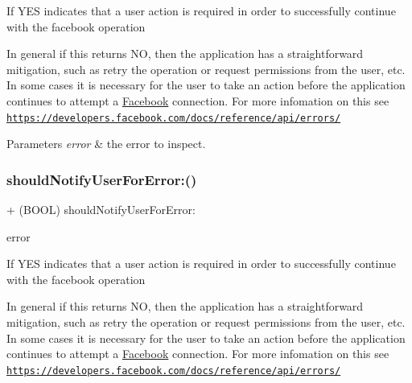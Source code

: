 If Y\+ES indicates that a user action is required in order to successfully continue with the facebook operation

In general if this returns NO, then the application has a straightforward mitigation, such as retry the operation or request permissions from the user, etc. In some cases it is necessary for the user to take an action before the application continues to attempt a \hyperlink{interfaceFacebook}{Facebook} connection. For more infomation on this see \href{https://developers.facebook.com/docs/reference/api/errors/}{\tt https\+://developers.\+facebook.\+com/docs/reference/api/errors/}


\begin{DoxyParams}{Parameters}
{\em error} & the error to inspect. \\
\hline
\end{DoxyParams}
\mbox{\label{interfaceFBErrorUtility_a1417132074a898433aa3a79ab6ebc7b6}} 
\subsubsection{\texorpdfstring{should\+Notify\+User\+For\+Error\+:()}{shouldNotifyUserForError:()}\hspace{0.1cm}{\footnotesize\ttfamily [4/5]}}
{\footnotesize\ttfamily + (B\+O\+OL) should\+Notify\+User\+For\+Error\+: \begin{DoxyParamCaption}\item[{(N\+S\+Error $\ast$)}]{error }\end{DoxyParamCaption}}

If Y\+ES indicates that a user action is required in order to successfully continue with the facebook operation

In general if this returns NO, then the application has a straightforward mitigation, such as retry the operation or request permissions from the user, etc. In some cases it is necessary for the user to take an action before the application continues to attempt a \hyperlink{interfaceFacebook}{Facebook} connection. For more infomation on this see \href{https://developers.facebook.com/docs/reference/api/errors/}{\tt https\+://developers.\+facebook.\+com/docs/reference/api/errors/}


